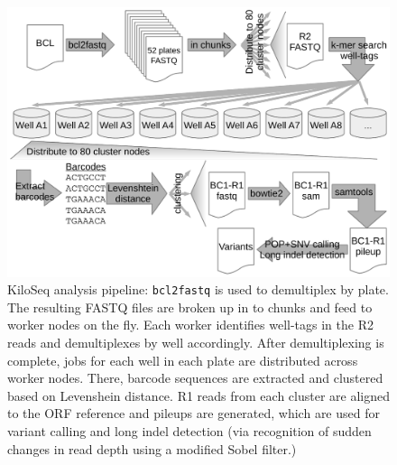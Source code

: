 \begin{figure}[h!]
	\centering
	\includegraphics[width=.6\textwidth]{img/kiloseq_pipeline.pdf}
	\caption{KiloSeq analysis pipeline: \texttt{bcl2fastq} is used to demultiplex by plate. The resulting FASTQ files are broken up in to chunks and feed to worker nodes on the fly. Each worker identifies well-tags in the R2 reads and demultiplexes by well accordingly. After demultiplexing is complete, jobs for each well in each plate are distributed across worker nodes. There, barcode sequences are extracted and clustered based on Levenshein distance. R1 reads from each cluster are aligned to the ORF reference and pileups are generated, which are used for variant calling and long indel detection (via recognition of sudden changes in read depth using a modified Sobel filter.)}
	\label{fig:kiloseqPipeline}
\end{figure}


